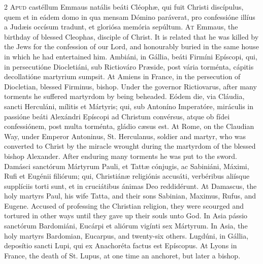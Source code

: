 \begin{paracol}{2}
\lettrine[lines=2]{A}{pud} castéllum Emmaus 
 natális beáti Cléophæ, qui fuit Christi discípulus, quem et in eádem domo in 
 qua mensam Dómino paráverat, pro confessióne illíus a Judæis occísum tradunt, 
 et gloriósa memória sepúltum.
\switchcolumn
{}
\lettrine[lines=2]{A}{t} Emmaus, the birthday of blessed 
 Cleophas, disciple of Christ. It is related that he was killed by the 
 Jews for the confession of our Lord, and honourably buried in the same house 
 in which he had entertained him.
\switchcolumn*
{}
Ambiáni, in Gállia, 
 beáti Firmíni Epíscopi, qui, in persecutióne Diocletiáni, sub Rictiováro 
 Præside, post vária torménta, cápitis decollatióne martyrium sumpsit.
\switchcolumn
{}
At Amiens in France, in the 
 persecution of Diocletian, blessed Firminus, bishop. Under the 
 governor Rictiovarus, after many torments he suffered martyrdom by being 
 beheaded.
\switchcolumn*
{}
Eódem die, via Cláudia, sancti Herculáni, mílitis et Mártyris; qui, sub Antoníno Imperatóre, 
 miráculis in passióne beáti Alexándri Epíscopi ad Christum convérsus, atque 
 ob fídei confessiónem, post multa torménta, gládio cæsus est.
\switchcolumn
{}
At Rome, on the Claudian Way, under 
 Emperor Antoninus, St. Herculanus, soldier and martyr, who was converted to 
 Christ by the miracle wrought during the martyrdom of the blessed bishop 
 Alexander. After enduring many torments he was put to the sword.
\switchcolumn*
{}
Damásci sanctórum 
 Mártyrum Pauli, et Tattæ cónjugis, ac Sabiniáni, Máximi, Rufi et Eugénii 
 filiórum; qui, Christiánæ religiónis accusáti, verbéribus aliísque 
 supplíciis torti sunt, et in cruciátibus ánimas Deo reddidérunt.
\switchcolumn
{}
At Damascus, the holy martyrs Paul, 
 his wife Tatta, and their sons Sabinian, Maximus, Rufus, and Eugene. 
 Accused of professing the Christian religion, they were scourged and 
 tortured in other ways until they gave up their souls unto God.
\switchcolumn*
{}
In Asia pássio 
 sanctórum Bardomiáni, Eucárpi et aliórum vigínti sex Mártyrum.
\switchcolumn
{}
In Asia, the holy martyrs Bardomian, 
 Eucarpus, and twenty-six others.
\switchcolumn*
{}
Lugdúni, in Gállia, 
 deposítio sancti Lupi, qui ex Anachoréta factus est Epíscopus.
\switchcolumn
{}
At Lyons in France, the death of St. 
 Lupus, at one time an anchoret, but later a bishop.

\end{paracol}

